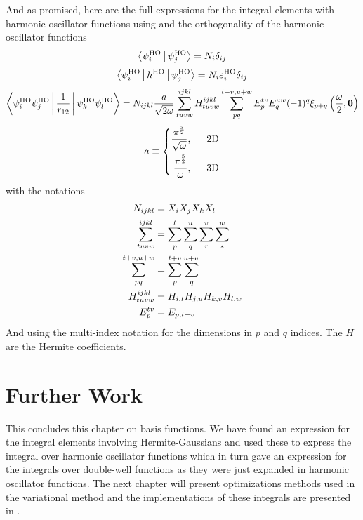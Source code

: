     And as promised, here are the full expressions for the integral elements with
    harmonic oscillator functions using  and the
    orthogonality of the harmonic oscillator functions
        \begin{equation}
            \Braket{\psiHO_i|\psiHO_j} = N_i \delta_{ij}
            \label{eq:HOoverlap}
        \end{equation}
        \begin{equation}
            \Braket{\psiHO_i|h^{\text{HO}}|\psiHO_j} = N_i
            \varepsilon^{\text{HO}}_i\delta_{ij}
        \end{equation}
        \begin{equation}
            \Braket{\psiHO_i\psiHO_j|\frac{1}{r_{12}}|\psiHO_k\psiHO_l} =
            N_{ijkl}\frac{a}{\sqrt{2\omega}}  \sum^{ijkl}_{tuvw}
            H^{ijkl}_{tuvw} \suml{pq}{t+v,u+w} E^{tv}_pE^{uw}_q
            (-1)^q\xi_{p+q}\left(\frac{\omega}{2}, \blds{0}\right)
        \end{equation}
        \begin{equation}
            a \equiv \left\{\begin{aligned}
                \frac{\pi^{\frac{3}{2}}} {\sqrt{\omega}},\indent \text{2D} \\
                \frac{\pi^{\frac{5}{2}}} {\omega},\indent \text{3D} \\
            \end{aligned}\right.
        \end{equation}
    with the notations
        \begin{equation}
            \begin{aligned}
                N_{ijkl} &= X_i X_j X_k X_l \\
                \suml{tuvw}{ijkl} &=
                \suml{p}{t}\suml{q}{u}\suml{r}{v}\suml{s}{w} \\
                \suml{pq}{t+v,u+w} &= \suml{p}{t+v}\suml{q}{u+w} \\
                H^{ijkl}_{tuvw} &= H_{i,t} H_{j,u} H_{k,v} H_{l,w} \\
                E^{tv}_p &= E_{p,t+v}
            \end{aligned}
        \end{equation}
    And using the multi-index notation for the dimensions in $p$ and $q$
    indices. The $H$ are the Hermite coefficients.

\section{Further Work}
    This concludes this chapter on basis functions. We have found an expression
    for the integral elements involving Hermite-Gaussians and used these to
    express the integral over harmonic oscillator functions which in turn gave
    an expression for the integrals over double-well functions as they were
    just expanded in harmonic oscillator functions. The next chapter will
    present optimizations methods used in the variational method and the
    implementations of these integrals are presented in . \\


